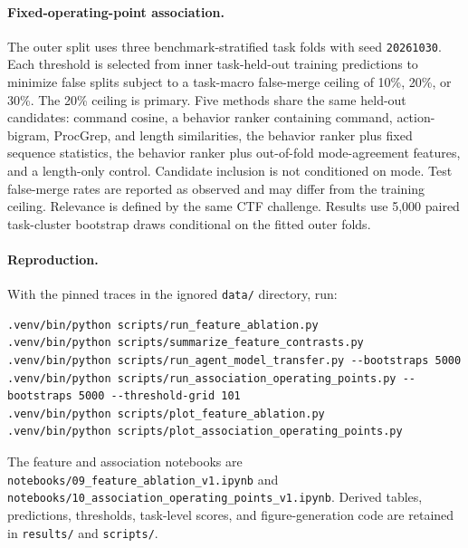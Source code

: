 \paragraph{Fixed-operating-point association.} The outer split uses three benchmark-stratified task folds with seed \texttt{20261030}. Each threshold is selected from inner task-held-out training predictions to minimize false splits subject to a task-macro false-merge ceiling of 10\%, 20\%, or 30\%. The 20\% ceiling is primary. Five methods share the same held-out candidates: command cosine, a behavior ranker containing command, action-bigram, ProcGrep, and length similarities, the behavior ranker plus fixed sequence statistics, the behavior ranker plus out-of-fold mode-agreement features, and a length-only control. Candidate inclusion is not conditioned on mode. Test false-merge rates are reported as observed and may differ from the training ceiling. Relevance is defined by the same CTF challenge. Results use 5,000 paired task-cluster bootstrap draws conditional on the fitted outer folds.

\paragraph{Reproduction.} With the pinned traces in the ignored \texttt{data/} directory, run:

\begin{verbatim}
.venv/bin/python scripts/run_feature_ablation.py
.venv/bin/python scripts/summarize_feature_contrasts.py
.venv/bin/python scripts/run_agent_model_transfer.py --bootstraps 5000
.venv/bin/python scripts/run_association_operating_points.py --bootstraps 5000 --threshold-grid 101
.venv/bin/python scripts/plot_feature_ablation.py
.venv/bin/python scripts/plot_association_operating_points.py
\end{verbatim}

The feature and association notebooks are \texttt{notebooks/09\_feature\_ablation\_v1.ipynb} and \texttt{notebooks/10\_association\_operating\_points\_v1.ipynb}. Derived tables, predictions, thresholds, task-level scores, and figure-generation code are retained in \texttt{results/} and \texttt{scripts/}.
